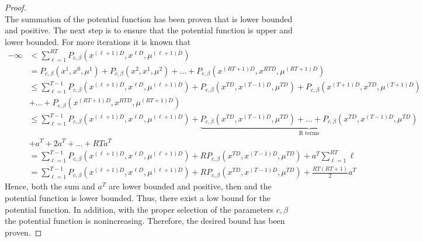 \begin{proof}
\begin{equation*}
        \end{equation*}
        The summation of the potential function has been proven that is lower bounded and positive. The next step is to ensure that the potential function is upper and lower bounded. For more iterations it is known that
        \begin{equation*}
            \begin{align}
                -\infty &< \sum_{\ell = 1}^{RT} P_{c,\beta}\left(x^{(\ell + 1)D}, x^{\ell D}, \mu^{(\ell + 1)D}\right)\\
                &= P_{c,\beta}\left(x^{ 1}, x^{0}, \mu^{1}\right) + P_{c,\beta}\left(x^{2}, x^{1}, \mu^{2}\right) + ...
                + P_{c,\beta}\left(x^{(RT + 1)D}, x^{RT D}, \mu^{(RT + 1)D}\right)\\
                &\leq \sum_{\ell = 1}^{T-1} P_{c,\beta}\left(x^{(\ell + 1)D}, x^{\ell D}, \mu^{(\ell + 1)D}\right) + P_{c,\beta}\left(x^{TD}, x^{(T-1) D}, \mu^{T D}\right) + P_{c,\beta}\left(x^{(T + 1)D}, x^{T D}, \mu^{(T +1)D}\right) \\&+...+ P_{c,\beta}\left(x^{(RT + 1)D}, x^{RT D}, \mu^{(RT + 1)D}\right)\\
                &\leq \sum_{\ell = 1}^{T-1} P_{c,\beta}\left(x^{(\ell + 1)D}, x^{\ell D}, \mu^{(\ell + 1)D}\right) +\underbrace{P_{c,\beta}\left(x^{TD}, x^{(T-1) D}, \mu^{T D}\right)+...+P_{c,\beta}\left(x^{TD}, x^{(T-1) D}, \mu^{T D}\right)}_\text{R terms}\\
                & + a^T + 2a^T + ... + RTa^T\\
                &= \sum_{\ell = 1}^{T-1} P_{c,\beta}\left(x^{(\ell + 1)D}, x^{\ell D}, \mu^{(\ell + 1)D}\right) + RP_{c,\beta}\left(x^{TD}, x^{(T-1) D}, \mu^{T D}\right) + a^T\sum_{\ell = 1}^{RT}\ell \\
                &=\sum_{\ell = 1}^{T - 1} P_{c,\beta}\left(x^{(\ell + 1)D}, x^{\ell D}, \mu^{(\ell + 1)D}\right) + RP_{c,\beta}\left(x^{TD}, x^{(T-1) D}, \mu^{T D}\right) + \frac{RT(RT + 1)}{2}a^T
            \end{align}
        \end{equation*}
        Hence, both the sum and $a^T$ are lower bounded and positive, then and the potential function is lower bounded. Thus, there exist a low bound for the potential function. In addition, with the proper selection of the parameters $c,\beta$ the potential function is nonincreasing. Therefore, the desired bound has been proven.
    \end{proof}
    
